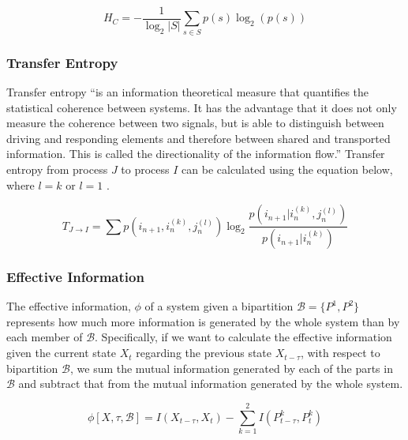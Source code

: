 \documentclass[a4paper,11pt]{article}
\begin{document}
\begin{equation} \label{eq:hc}
H_C = - \frac{1}{\log_2 |S|}\sum_{s \in S}p(s) \log_2 (p(s))
\end{equation}

\subsubsection{Transfer Entropy}
Transfer entropy ``is an information theoretical measure that quantifies the statistical coherence between systems. It has the advantage that it does not only measure the coherence between two signals, but is able to distinguish between driving and responding elements and therefore between shared and transported information. This is called the directionality of the information flow.'' \cite{Buehlmann2010} Transfer entropy from process $J$ to process $I$ can be calculated using the equation below, where $l = k$ or $l = 1$ \cite{Schreiber2000}.

\begin{equation} \label{eq:te}
T_{J \rightarrow I} = \sum p(i_{n+1}, i_{n}^{(k)}, j_{n}^{(l)}) \log_2 \frac{p(i_{n+1} | i_{n}^{(k)}, j_{n}^{(l)})}{p(i_{n+1} | i_{n}^{(k)})}
\end{equation}

\subsubsection{Effective Information}
\label{EI}

The effective information, $\phi$ of a system given a bipartition $\mathcal{B} = \lbrace P^1, P^2 \rbrace$ represents how much more information is generated by the whole system than by each member of $\mathcal{B}$. Specifically, if we want to calculate the effective information given the current state $X_t$ regarding the previous state $X_{t - \tau}$, with respect to bipartition $\mathcal{B}$, we sum the mutual information generated by each of the parts in $\mathcal{B}$ and subtract that from the mutual information generated by the whole system.

\begin{equation} \label{eq:ei}
\phi [X, \tau, \mathcal{B}] = I(X_{t-\tau}, X_t) - \sum_{k=1}^{2} I(P_{t-\tau}^k, P_{t}^k)
\end{equation}

\end{document}
